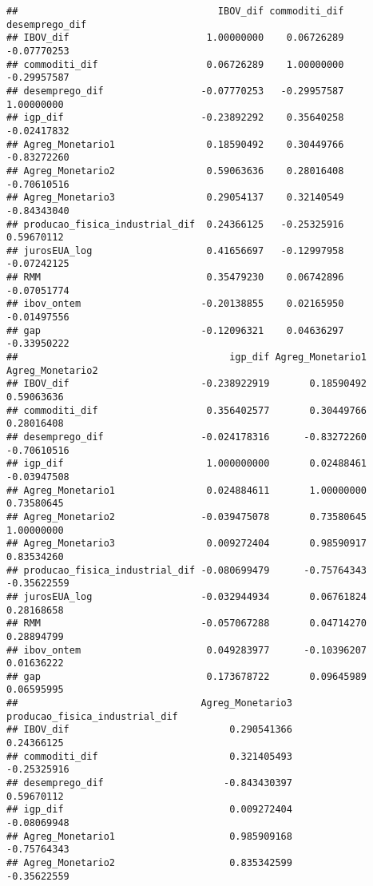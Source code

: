 \documentclass[
]{article}
\begin{document}
\begin{verbatim}
##                                   IBOV_dif commoditi_dif desemprego_dif
## IBOV_dif                        1.00000000    0.06726289    -0.07770253
## commoditi_dif                   0.06726289    1.00000000    -0.29957587
## desemprego_dif                 -0.07770253   -0.29957587     1.00000000
## igp_dif                        -0.23892292    0.35640258    -0.02417832
## Agreg_Monetario1                0.18590492    0.30449766    -0.83272260
## Agreg_Monetario2                0.59063636    0.28016408    -0.70610516
## Agreg_Monetario3                0.29054137    0.32140549    -0.84343040
## producao_fisica_industrial_dif  0.24366125   -0.25325916     0.59670112
## jurosEUA_log                    0.41656697   -0.12997958    -0.07242125
## RMM                             0.35479230    0.06742896    -0.07051774
## ibov_ontem                     -0.20138855    0.02165950    -0.01497556
## gap                            -0.12096321    0.04636297    -0.33950222
##                                     igp_dif Agreg_Monetario1 Agreg_Monetario2
## IBOV_dif                       -0.238922919       0.18590492       0.59063636
## commoditi_dif                   0.356402577       0.30449766       0.28016408
## desemprego_dif                 -0.024178316      -0.83272260      -0.70610516
## igp_dif                         1.000000000       0.02488461      -0.03947508
## Agreg_Monetario1                0.024884611       1.00000000       0.73580645
## Agreg_Monetario2               -0.039475078       0.73580645       1.00000000
## Agreg_Monetario3                0.009272404       0.98590917       0.83534260
## producao_fisica_industrial_dif -0.080699479      -0.75764343      -0.35622559
## jurosEUA_log                   -0.032944934       0.06761824       0.28168658
## RMM                            -0.057067288       0.04714270       0.28894799
## ibov_ontem                      0.049283977      -0.10396207       0.01636222
## gap                             0.173678722       0.09645989       0.06595995
##                                Agreg_Monetario3 producao_fisica_industrial_dif
## IBOV_dif                            0.290541366                     0.24366125
## commoditi_dif                       0.321405493                    -0.25325916
## desemprego_dif                     -0.843430397                     0.59670112
## igp_dif                             0.009272404                    -0.08069948
## Agreg_Monetario1                    0.985909168                    -0.75764343
## Agreg_Monetario2                    0.835342599                    -0.35622559

\end{verbatim}
\end{document}
